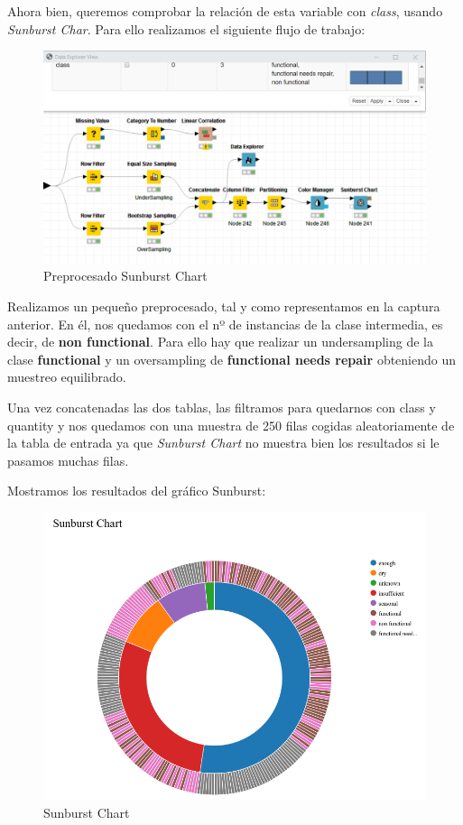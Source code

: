	
	
	
	
	
	Ahora bien, queremos comprobar la relación de esta variable con \textit{class}, usando \textit{Sunburst Char}. Para ello realizamos el siguiente flujo de trabajo:
	
		\begin{figure}[H]
		\centering
		\includegraphics[width=1\textwidth]{img/igual.png}
		\caption{Preprocesado Sunburst Chart}
	\end{figure}

	Realizamos un pequeño preprocesado, tal y como representamos en la captura anterior. En él, nos quedamos con el nº de instancias de la clase intermedia, es decir, de \textbf{non functional}. Para ello hay que realizar un undersampling de la clase \textbf{functional} y un oversampling de \textbf{functional needs repair} obteniendo un muestreo equilibrado.
	
	Una vez concatenadas las dos tablas, las filtramos para quedarnos con {class y quantity}  y nos quedamos con una muestra de 250 filas cogidas aleatoriamente de la tabla de entrada ya que \textit{Sunburst Chart} no muestra bien los resultados si le pasamos muchas filas.
	
	Mostramos los resultados del gráfico Sunburst:
	
	
	
	\begin{figure}[H]
		\centering
		\includegraphics[width=1\textwidth]{img/sunb.png}
		\caption{Sunburst Chart}
	\end{figure}
	
